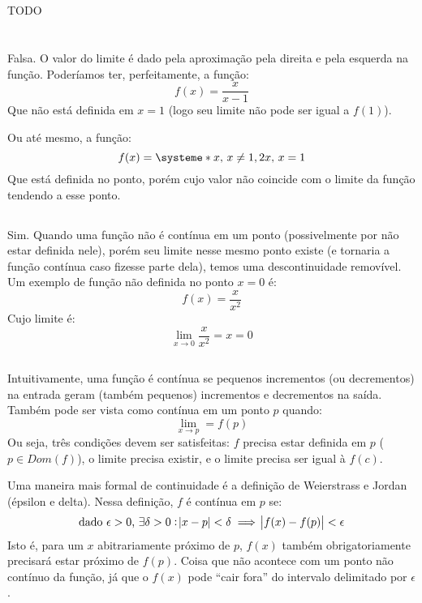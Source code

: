 \documentclass[12pt]{article}
\begin{document}
\subsection{}
TODO

\section{}

\section{}
\subsection{}
Falsa. O valor do limite é dado pela aproximação pela direita e pela esquerda na função. Poderíamos ter, perfeitamente, a função:
\[
f(x) = \frac{x}{x-1}
\]
Que não está definida em \(x=1\) (logo seu limite não pode ser igual a \(f(1 )\)).

Ou até mesmo, a função:
\[
	f(x) = \systeme*{x\text{, } x \neq 1, 2x\text{, } x = 1}
\]
Que está definida no ponto, porém cujo valor não coincide com o limite da função tendendo a esse ponto.

\subsection{}
Sim. Quando uma função não é contínua em um ponto (possivelmente por não estar definida nele), porém seu limite nesse mesmo ponto existe (e tornaria a função contínua caso fizesse parte dela), temos uma descontinuidade removível.
Um exemplo de função não definida no ponto \(x=0\) é:
\[
	f(x) = \frac{x}{x^2}
\]
Cujo limite é:
\[
	\lim_{x \rightarrow 0} \frac{x}{x^2} = x = 0
\]
\subsection{}
Intuitivamente, uma função é contínua se pequenos incrementos (ou decrementos) na entrada geram (também pequenos) incrementos e decrementos na saída. Também pode ser vista como contínua em um ponto \(p\) quando:
\[
	\lim_{x \rightarrow p} = f(p)
\]
Ou seja, três condições devem ser satisfeitas: \(f\) precisa estar definida em \(p\) (\(p \in Dom(f)\)), o limite precisa existir, e o limite precisa ser igual à \(f(c)\).
\bigskip

Uma maneira mais formal de continuidade é a definição de Weierstrass e Jordan (épsilon e delta). Nessa definição, \(f\) é contínua em \(p\) se:
\[
	\text{dado } \epsilon > 0\text{, } \exists \delta > 0: \abs{x-p} < \delta \implies \abs{f(x) - f(p)} < \epsilon
\]
Isto é, para um \(x\) abitrariamente próximo de \(p\), \(f(x)\) também obrigatoriamente precisará estar próximo de \(f(p)\). Coisa que não acontece com um ponto não contínuo da função, já que o \(f(x)\) pode ``cair fora'' do intervalo delimitado por \(\epsilon\).
\end{document}
